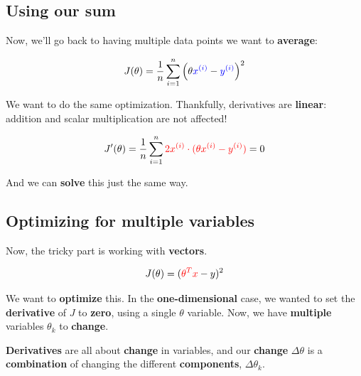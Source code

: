         
    \subsection{Using our sum}
    
        Now, we'll go back to having multiple data points we want to \textbf{average}:
        
        \begin{equation}
            J(\theta) = \frac{1}{n}  \sum_{i=1}^n 
            \left( \theta \textcolor{blue}{x^{(i)}}  
            - \textcolor{blue}{y^{(i)}} \right)^2 
        \end{equation}
        
        We want to do the same optimization. Thankfully, derivatives are \textbf{linear}: addition and scalar multiplication are not affected!
        
        \begin{equation}
            J'(\theta) = \frac{1}{n}  \sum_{i=1}^n \textcolor{red}{2 x^{(i)} \cdot
            (\theta x^{(i)}  - y^{(i)} )} = 0
        \end{equation}
        
        And we can \textbf{solve} this just the same way.
        
    \subsection{Optimizing for multiple variables}
    
        Now, the tricky part is working with \textbf{vectors}.
        
        \begin{equation}
            J(\theta) = (\textcolor{red}{ \theta^T x  } - y )^2
        \end{equation}
        
        We want to \textbf{optimize} this. In the \textbf{one-dimensional} case, we wanted to set the \textbf{derivative} of $J$ to \textbf{zero}, using a single $\theta$ variable. Now, we have \textbf{multiple} variables $\theta_k$ to \textbf{change}.
        
        \textbf{Derivatives} are all about \textbf{change} in variables, and our \textbf{change} $\Delta \theta$ is a \textbf{combination} of changing the different \textbf{components}, $\Delta \theta_k$. 
        
